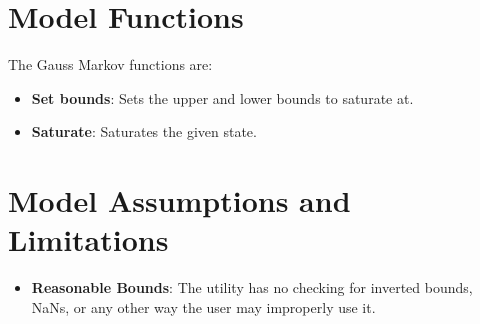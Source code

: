 \section{Model Functions}
The Gauss Markov functions are:
\begin{itemize}
	\item \textbf{Set bounds}: Sets the upper and lower bounds to saturate at.
	\item \textbf{Saturate}: Saturates the given state.
\end{itemize}


\section{Model Assumptions and Limitations}
\begin{itemize}
	\item \textbf{Reasonable Bounds}: The utility has no checking for inverted bounds, NaNs, or any other way the user may improperly use it.
\end{itemize}